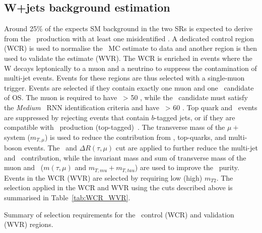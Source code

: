 	\subsection*{W+jets background estimation}
	\label{subsec:Wjet_estimation}
	Around 25\% of the expects \ac{SM} background in the two \acp{SR} is expected to derive from the \Wjets\ production with at least one misidentified \ltau. A dedicated control region (WCR) is used to normalise the \Wjets\ \ac{MC} estimate to data and another region is then used to validate the estimate (WVR).
	The WCR is enriched in events where the W decays leptonically to a muon and a neutrino to suppress the contamination of multi-jet events.  Events for these regions are thus selected with a single-muon trigger. 
	Events are selected if they contain exactly one muon and one \ltau\ candidate of \ac{OS}. 
	The muon is required to have \pt\ > 50 \gev, while the \ltau\ candidate must satisfy the \textit{Medium} \ltau\ \ac{RNN} identification criteria and have \pt\ > 60 \gev. 
	 Top quark and \ttbar\ events are suppressed by rejecting events that contain $b$-tagged jets, or if they are compatible with \ttbar\ production (top-tagged)~\cite{Tovey_2008}. 
	 The transverse mass of the $\mu+$\met system ($m_{T,\mu}$) is used to reduce the contribution from \Zjets, top-quarks, and multi-boson events.
	  The \met\ and $\Delta R(\tau,\mu)$ cut are applied to further reduce the multi-jet and \Zjets\ contribution, while the invariant mass and sum of transverse mass of the muon and \ltau\ ($m(\tau,\mu)$ and $m_{T,mu}+m_{T,tau}$) are used to improve the \Wjets\ purity. Events in the WCR (WVR) are selected by requiring low (high) $m_{T2}$.
	  The selection applied in the WCR and WVR using the cuts described above is summarised in Table~\ref{tab:WCR_WVR}.
	\begin{table}[!hbt]
	\centering
	\caption{Summary of selection requirements for the \Wjets\ control (WCR) and validation (WVR) regions.}
		
	\label{tab:WCR_WVR}
	\end{table}
	
